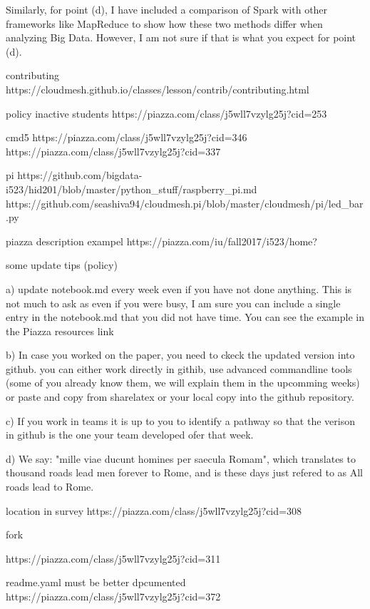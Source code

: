 Similarly, for point (d), I have included a comparison of Spark with
other frameworks like MapReduce to show how these two methods differ
when analyzing Big Data. However, I am not sure if that is what you
expect for point (d).

 



contributing
https://cloudmesh.github.io/classes/lesson/contrib/contributing.html

policy inactive students
https://piazza.com/class/j5wll7vzylg25j?cid=253

cmd5
https://piazza.com/class/j5wll7vzylg25j?cid=346
https://piazza.com/class/j5wll7vzylg25j?cid=337


pi
https://github.com/bigdata-i523/hid201/blob/master/python_stuff/raspberry_pi.md
https://github.com/seashiva94/cloudmesh.pi/blob/master/cloudmesh/pi/led_bar.py



piazza description exampel
https://piazza.com/iu/fall2017/i523/home?


some update tips (policy)

a) update notebook.md every week even if you have not done
anything. This is not much to ask as even if you were busy, I am sure
you can include a single entry in the notebook.md that you did not
have time. You can see the example in the Piazza resources link

 

b) In case you worked on the paper, you need to ckeck the updated
version into github. you can either work directly in githib, use
advanced commandline tools (some of you already know them, we will
explain them in the upcomming weeks) or paste and copy from sharelatex
or your local copy into the github repository.

 

c) If you work in teams it is up to you to identify a pathway so that
the verison in github is the one your team developed ofer that week.

 

d) We say: "mille viae ducunt homines per saecula Romam", which
translates to thousand roads lead men forever to Rome, and is these
days just refered to as All roads lead to Rome.

location in survey
https://piazza.com/class/j5wll7vzylg25j?cid=308


fork

https://piazza.com/class/j5wll7vzylg25j?cid=311

readme.yaml must be better dpcumented
https://piazza.com/class/j5wll7vzylg25j?cid=372

